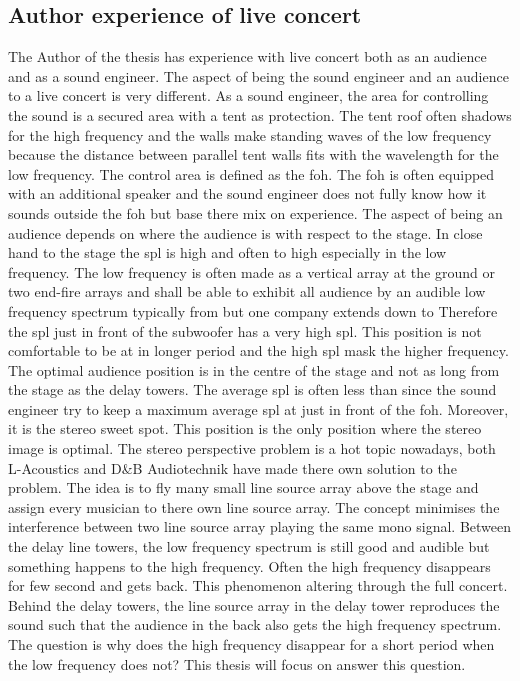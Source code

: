 \subsection{Author experience of live concert}\label{sec:ana:aut_exp_con}
The Author of the thesis has experience with live concert both as an audience and as a sound engineer. The aspect of being the sound engineer and an audience to a live concert is very different. As a sound engineer, the area for controlling the sound is a secured area with a tent as protection. The tent roof often shadows for the high frequency and the walls make standing waves of the low frequency because the distance between parallel tent walls fits with the wavelength for the low frequency. The control area is defined as the \gls{foh}. The \gls{foh} is often equipped with an additional speaker and the sound engineer does not fully know how it sounds outside the \gls{foh} but base there mix on experience. The aspect of being an audience depends on where the audience is with respect to the stage. In close hand to the stage the \gls{spl} is high and often to high especially in the low frequency. The low frequency is often made as a vertical array at the ground or two end-fire arrays and shall be able to exhibit all audience by an audible low frequency spectrum typically from  but one company extends down to  Therefore the \gls{spl} just in front of the subwoofer has a very high \gls{spl}. This position is not comfortable to be at in longer period and the high \gls{spl} mask the higher frequency. The optimal audience position is in the centre of the stage and not as long from the stage as the delay towers. The average \gls{spl} is often less than  since the sound engineer try to keep a maximum average \gls{spl} at  just in front of the \gls{foh}. Moreover, it is the stereo sweet spot. This position is the only position where the stereo image is optimal. The stereo perspective problem is a hot topic nowadays, both L-Acoustics \citep{l_acoustics_l_isa} and D\&B Audiotechnik \citep{dbsoundscape} have made there own solution to the problem. The idea is to fly many small line source array above the stage and assign every musician to there own line source array. The concept minimises the interference between two line source array playing the same mono signal. 
Between the delay line towers, the low frequency spectrum is still good and audible but something happens to the high frequency. Often the high frequency disappears for few second and gets back. This phenomenon altering through the full concert. Behind the delay towers, the line source array in the delay tower reproduces the sound such that the audience in the back also gets the high frequency spectrum. The question is why does the high frequency disappear for a short period when the low frequency does not? This thesis will focus on answer this question.

 
